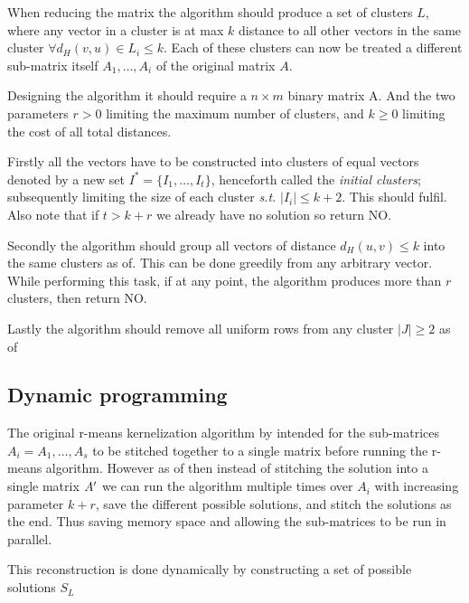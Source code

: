 \documentclass[a4paper]{article}
\begin{document}
When reducing the matrix the algorithm should produce a set of clusters $L$, where any vector in a cluster is at max $k$ distance to all
other vectors in the same cluster $\forall d_H(v, u) \in L_i \leq k$. Each of these clusters can now be treated a 
different sub-matrix itself $A_1, \dots, A_i$ of the original matrix $A$.

Designing the algorithm it should require a $n \times m$ binary matrix A. And the two parameters $r > 0$ limiting the
maximum number of clusters, and $k \geq 0$ limiting the cost of all total distances.

Firstly all the vectors have to be constructed into clusters of equal vectors denoted by a new set $I^* = \{I_1, \dots, I_t\}$, henceforth 
called the \textit{initial clusters}; subsequently limiting the size of each cluster \textit{s.t.} $|I_i| \leq k+2$. This should
fulfil. Also note that if $t > k+r$ we already have no solution so return NO.

Secondly the algorithm should group all vectors of distance $d_H(u,v) \leq k$ into the same clusters as of. This can be done greedily from any
arbitrary vector. While performing this task, if at any point, the algorithm produces more than $r$ clusters, then return NO.

Lastly the algorithm should remove all uniform rows from any cluster $|J| \geq 2$ as of


\subsection{Dynamic programming}
The original r-means kernelization algorithm by \cite{fomin_golovach_panolan_2020}
intended for the sub-matrices $A_i=A_1,\dots,A_s$ to be stitched together to a single
matrix before running the r-means algorithm. However as of \cite[Lemma 5]{fomin_golovach_panolan_2020}
then instead of stitching the solution into a single matrix $A\sp{\prime}$
we can run the algorithm multiple times over $A_i$ with increasing parameter $k+r$,
save the different possible solutions, and stitch the solutions as the end. Thus saving
memory space and allowing the sub-matrices to be run in parallel.

This reconstruction is done dynamically by constructing a set of possible solutions $S_L$

\end{document}
